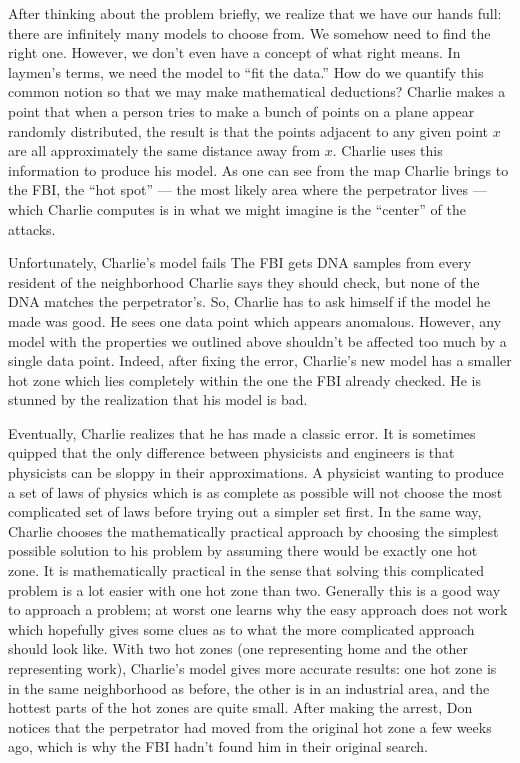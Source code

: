 After thinking about the problem briefly, we realize that we have our hands full: there are infinitely many models to choose from. We somehow need to find the right one. However, we don't even have a concept of what right means. In laymen's terms, we need the model to ``fit the data.'' How do we quantify this common notion so that we may make mathematical deductions? Charlie makes a point that when a person tries to make a bunch of points on a plane appear randomly distributed, the result is that the points adjacent to any given point $x$ are all approximately the same distance away from $x$.  Charlie uses this information to produce his model. As one can see from the map Charlie brings to the FBI, the ``hot spot'' --- the most likely area where the perpetrator lives --- which Charlie computes is in what we might imagine is the ``center'' of the attacks.


Unfortunately, Charlie's model fails The FBI gets DNA samples from every resident of the neighborhood Charlie says they should check, but none of the DNA matches the perpetrator's. So, Charlie has to ask himself if the model he made was good. He sees one data point which appears anomalous. However, any model with the properties we outlined above shouldn't be affected too much by a single data point.  Indeed, after fixing the error, Charlie's new model has a smaller hot zone which lies completely within the one the FBI already checked. He is stunned by the realization that his model is bad. 


Eventually, Charlie realizes that he has made a classic error. It is sometimes quipped that the only difference between physicists and engineers is that physicists can be sloppy in their approximations. A physicist wanting to produce a set of laws of physics which is as complete as possible will not choose the most complicated set of laws before trying out a simpler set first. In the same way, Charlie chooses the mathematically practical approach by choosing the simplest possible solution to his problem by assuming there would be exactly one hot zone. It is mathematically practical in the sense that solving this complicated problem is a lot easier with one hot zone than two. Generally this is a good way to approach a problem; at worst one learns why the easy approach does not work which hopefully gives some clues as to what the more complicated approach should look like. With two hot zones (one representing home and the other representing work), Charlie's model gives more accurate results: one hot zone is in the same neighborhood as before, the other is in an industrial area, and the hottest parts of the hot zones are quite small. After making the arrest, Don notices that the perpetrator had moved from the original hot zone a few weeks ago, which is why the FBI hadn't found him in their original search.
 

